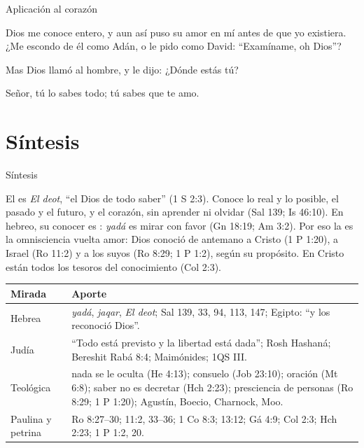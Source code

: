 \begin{frame}{Aplicación al corazón}
\begin{tcolorbox}[colback=papiro,colframe=dorado,boxrule=1.4pt,arc=3pt]
\centering\large Dios me conoce entero, y aun así puso su amor en mí antes de que yo existiera. ¿Me escondo de él como Adán, o le pido como David: ``Examíname, oh Dios''?
\end{tcolorbox}\par\medskip
\begin{cita}Mas \SENOR{} Dios llamó al hombre, y le dijo: ¿Dónde estás tú?\end{cita}
\begin{cita}Señor, tú lo sabes todo; tú sabes que te amo.\end{cita}
\end{frame}

\section{Síntesis}

\begin{frame}{Síntesis}
\begin{tcolorbox}[colback=papiro,colframe=azul,boxrule=1pt,arc=3pt]
\small El \SENOR{} es \emph{El deot}, ``el Dios de todo saber'' (1 S 2:3). Conoce lo real y lo posible, el pasado y el futuro, y el corazón, sin aprender ni olvidar (Sal 139; Is 46:10). En hebreo, su conocer es : \emph{yadá} es mirar con favor (Gn 18:19; Am 3:2). Por eso la  es la omnisciencia vuelta amor: Dios conoció de antemano a Cristo (1 P 1:20), a Israel (Ro 11:2) y a los suyos (Ro 8:29; 1 P 1:2), según su propósito. En Cristo están todos los tesoros del conocimiento (Col 2:3).
\end{tcolorbox}
\scriptsize\renewcommand{\arraystretch}{1.12}
\begin{tabular}{@{}>{\RaggedRight\arraybackslash}p{2.4cm}>{\RaggedRight\arraybackslash}p{9.4cm}@{}}
\toprule
\textbf{Mirada} & \textbf{Aporte} \\ \midrule
Hebrea & \emph{yadá}, \emph{jaqar}, \emph{El deot}; Sal 139, 33, 94, 113, 147; Egipto: ``y los reconoció Dios''. \\
Judía & ``Todo está previsto y la libertad está dada''; Rosh Hashaná; Bereshit Rabá 8:4; Maimónides; 1QS III. \\
Teológica & nada se le oculta (He 4:13); consuelo (Job 23:10); oración (Mt 6:8); saber no es decretar (Hch 2:23); presciencia de personas (Ro 8:29; 1 P 1:20); Agustín, Boecio, Charnock, Moo. \\
Paulina y petrina & Ro 8:27--30; 11:2, 33--36; 1 Co 8:3; 13:12; Gá 4:9; Col 2:3; Hch 2:23; 1 P 1:2, 20. \\
\bottomrule
\end{tabular}
\end{frame}

